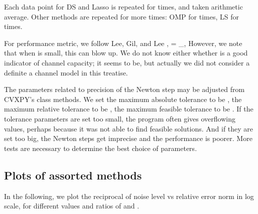 Each data point for DS and Lasso is repeated for  times, and taken arithmetic average.
Other methods are repeated for more times: OMP for  times, LS for  times.

For performance metric, we follow Lee, Gil, and Lee \cite {LGL16},
 {
\tilde {\chi}
= _{}, \NR
}
However, we note that when  is small, this can blow up.
We do not know either whether \m {\tilde {\chi}} is a good indicator of channel capacity; it seems to be, but actually we did not consider a definite a channel model in this treatise.

The parameters related to precision of the Newton step may be adjusted from CVXPY's class methods.
We set the maximum absolute tolerance to be ,
the maximum relative tolerance to be ,
the maximum feasible tolerance to be .
If the tolerance parameters are set too small, the program often gives overflowing values, perhaps because it was not able to find feasible solutions.
And if they are set too big, the Newton steps get imprecise and the performance is poorer.
More tests are necessary to determine the best choice of parameters.



\subsection {Plots of assorted methods}

In the following, we plot the reciprocal of noise level vs relative error norm in log scale, for different values and ratios of  and .


